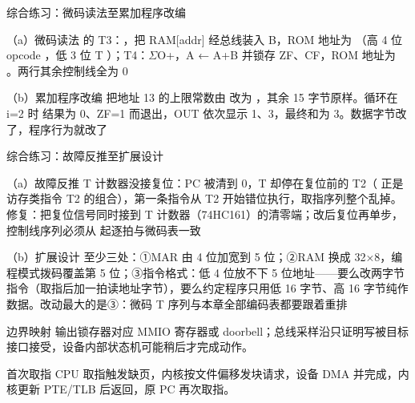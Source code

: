 \begin{chapteranswer}{综合练习：微码读法至累加程序改编}
\begin{answersubproblem}{（a）微码读法}
 的 T3：，把 RAM[addr] 经总线装入 B，ROM 地址为 （高 4 位 opcode ，低 3 位 T ）；T4：$\Sigma$O+，A ← A+B 并锁存 ZF、CF，ROM 地址为 。两行其余控制线全为 0
\end{answersubproblem}
\begin{answersubproblem}{（b）累加程序改编}
把地址 13 的上限常数由  改为 ，其余 15 字节原样。循环在 i=2 时  结果为 0、ZF=1 而退出，OUT 依次显示 1、3，最终和为 3。数据字节改了，程序行为就改了
\end{answersubproblem}
\end{chapteranswer}

\begin{chapteranswer}{综合练习：故障反推至扩展设计}
\begin{answersubproblem}{（a）故障反推}
T 计数器没接复位：PC 被清到 0，T 却停在复位前的 T2（ 正是访存类指令 T2 的组合），第一条指令从 T2 开始错位执行，取指序列整个乱掉。修复：把复位信号同时接到 T 计数器（74HC161）的清零端；改后复位再单步，控制线序列必须从  起逐拍与微码表一致
\end{answersubproblem}
\begin{answersubproblem}{（b）扩展设计}
至少三处：①MAR 由 4 位加宽到 5 位；②RAM 换成 32×8，编程模式拨码覆盖第 5 位；③指令格式：低 4 位放不下 5 位地址——要么改两字节指令（取指后加一拍读地址字节），要么约定程序只用低 16 字节、高 16 字节纯作数据。改动最大的是③：微码 T 序列与本章全部编码表都要跟着重排
\end{answersubproblem}
\end{chapteranswer}

\begin{chapteranswer}{边界映射}
输出锁存器对应 MMIO 寄存器或 doorbell；总线采样沿只证明写被目标接口接受，设备内部状态机可能稍后才完成动作。
\end{chapteranswer}

\begin{chapteranswer}{首次取指}
CPU 取指触发缺页，内核按文件偏移发块请求，设备 DMA 并完成，内核更新 PTE/TLB 后返回，原 PC 再次取指。
\end{chapteranswer}

